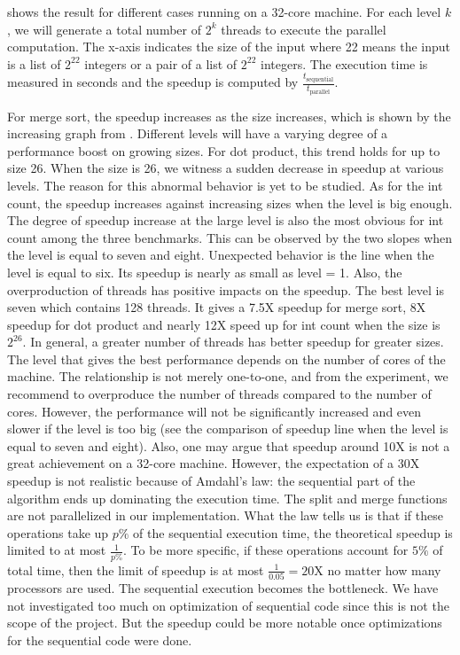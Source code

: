  shows the result for different cases running on a 32-core machine. For each level $k$, we will generate a total number of $2^k$ threads to execute the parallel computation. The x-axis indicates the size of the input where 22 means the input is a list of $2^{22}$ integers or a pair of a list of $2^{22}$ integers. The execution time is measured in seconds and the speedup is computed by $\frac{t_{\text{sequential}}}{t_\text{parallel}}$. 

For merge sort, the speedup increases as the size increases, which is shown by the increasing graph from . Different levels will have a varying degree of a performance boost on growing sizes. For dot product, this trend holds for up to size 26. When the size is 26, we witness a sudden decrease in speedup at various levels. The reason for this abnormal behavior is yet to be studied. As for the int count, the speedup increases against increasing sizes when the level is big enough. The degree of speedup increase at the large level is also the most obvious for int count among the three benchmarks. This can be observed by the two slopes when the level is equal to seven and eight. Unexpected behavior is the line when the level is equal to six. Its speedup is nearly as small as level = 1. Also, the overproduction of threads has positive impacts on the speedup. The best level is seven which contains 128 threads. It gives a 7.5X speedup for merge sort, 8X speedup for dot product and nearly 12X speed up for int count when the size is $2^{26}$. In general, a greater number of threads has better speedup for greater sizes. The level that gives the best performance depends on the number of cores of the machine. The relationship is not merely one-to-one, and from the experiment, we recommend to overproduce the number of threads compared to the number of cores. However, the performance will not be significantly increased and even slower if the level is too big (see the comparison of speedup line when the level is equal to seven and eight). Also, one may argue that speedup around 10X is not a great achievement on a 32-core machine. However, the expectation of a 30X speedup is not realistic because of Amdahl's law: the sequential part of the algorithm ends up dominating the execution time. The split and merge functions are not parallelized in our implementation. What the law tells us is that if these operations take up $p\%$ of the sequential execution time, the theoretical speedup is limited to at most $\frac{1}{p\%}$. To be more specific, if these operations account for $5\%$ of total time, then the limit of speedup is at most $\frac{1}{0.05} = 20$X no matter how many processors are used. The sequential execution becomes the bottleneck. We have not investigated too much on optimization of sequential code since this is not the scope of the project. But the speedup could be more notable once optimizations for the sequential code were done.